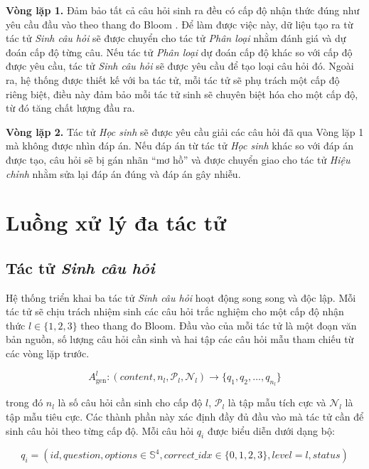 \textbf{Vòng lặp 1.} Đảm bảo tất cả câu hỏi sinh ra đều có cấp độ nhận thức đúng như yêu cầu đầu vào theo thang đo Bloom \cite{bloom1956taxonomy}. Để làm được việc này, dữ liệu tạo ra từ tác tử \textit{Sinh câu hỏi} sẽ được chuyển cho tác tử \textit{Phân loại} nhằm đánh giá và dự đoán cấp độ từng câu. Nếu tác tử \textit{Phân loại} dự đoán cấp độ khác so với cấp độ được yêu cầu, tác tử \textit{Sinh câu hỏi} sẽ được yêu cầu để tạo loại câu hỏi đó. Ngoài ra, hệ thống được thiết kế với ba tác tử, mỗi tác tử sẽ phụ trách một cấp độ riêng biệt, điều này đảm bảo mỗi tác tử sinh sẽ chuyên biệt hóa cho một cấp độ, từ đó tăng chất lượng đầu ra.

\textbf{Vòng lặp 2.} Tác tử \textit{Học sinh} sẽ được yêu cầu giải các câu hỏi đã qua Vòng lặp 1 mà không được nhìn đáp án. Nếu đáp án từ tác tử \textit{Học sinh} khác so với đáp án được tạo, câu hỏi sẽ bị gán nhãn ``mơ hồ'' và được chuyển giao cho tác tử \textit{Hiệu chỉnh} nhằm sửa lại đáp án đúng và đáp án gây nhiễu.

\section{Luồng xử lý đa tác tử}

\subsection{Tác tử \textit{Sinh câu hỏi}}
Hệ thống triển khai ba tác tử \textit{Sinh câu hỏi} hoạt động song song và độc lập. Mỗi tác tử sẽ chịu trách nhiệm sinh các câu hỏi trắc nghiệm cho một cấp độ nhận thức $l \in \{1,2,3\}$ theo thang đo Bloom. Đầu vào của mỗi tác tử là một đoạn văn bản nguồn, số lượng câu hỏi cần sinh và hai tập các câu hỏi mẫu tham chiếu từ các vòng lặp trước.

\begin{equation}
A_{\text{gen}}^l: (\textit{content}, n_l, \mathcal{P}_l, \mathcal{N}_l) \longrightarrow \{q_1, q_2, \ldots, q_{n_l}\}
\end{equation}

\noindent trong đó $n_l$ là số câu hỏi cần sinh cho cấp độ $l$, $\mathcal{P}_l$ là tập mẫu tích cực và $\mathcal{N}_l$ là tập mẫu tiêu cực. Các thành phần này xác định đầy đủ đầu vào mà tác tử cần để sinh câu hỏi theo từng cấp độ. Mỗi câu hỏi $q_i$ được biểu diễn dưới dạng bộ:

\begin{equation}
q_i = (\textit{id}, \textit{question}, \textit{options} \in \mathbb{S}^4, \textit{correct\_idx} \in \{0,1,2,3\}, \textit{level} = l, \textit{status})
\end{equation}

